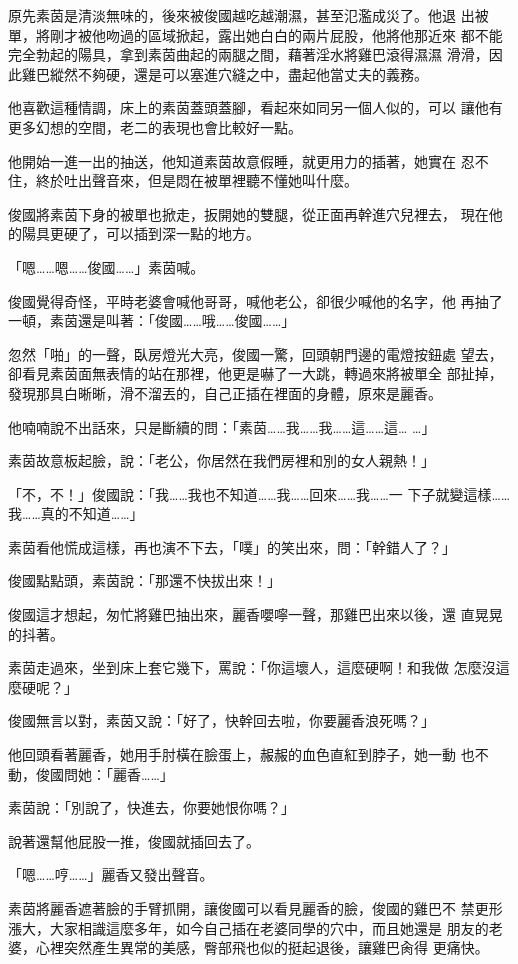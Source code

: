 原先素茵是清淡無味的，後來被俊國越吃越潮濕，甚至氾濫成災了。他退
出被單，將剛才被他吻過的區域掀起，露出她白白的兩片屁股，他將他那近來
都不能完全勃起的陽具，拿到素茵曲起的兩腿之間，藉著淫水將雞巴滾得濕濕
滑滑，因此雞巴縱然不夠硬，還是可以塞進穴縫之中，盡起他當丈夫的義務。

他喜歡這種情調，床上的素茵蓋頭蓋腳，看起來如同另一個人似的，可以
讓他有更多幻想的空間，老二的表現也會比較好一點。

他開始一進一出的抽送，他知道素茵故意假睡，就更用力的插著，她實在
忍不住，終於吐出聲音來，但是悶在被單裡聽不懂她叫什麼。

俊國將素茵下身的被單也掀走，扳開她的雙腿，從正面再幹進穴兒裡去，
現在他的陽具更硬了，可以插到深一點的地方。

「嗯……嗯……俊國……」素茵喊。

俊國覺得奇怪，平時老婆會喊他哥哥，喊他老公，卻很少喊他的名字，他
再抽了一頓，素茵還是叫著：「俊國……哦……俊國……」

忽然「啪」的一聲，臥房燈光大亮，俊國一驚，回頭朝門邊的電燈按鈕處
望去，卻看見素茵面無表情的站在那裡，他更是嚇了一大跳，轉過來將被單全
部扯掉，發現那具白晰晰，滑不溜丟的，自己正插在裡面的身體，原來是麗香。

他喃喃說不出話來，只是斷續的問：「素茵……我……我……這……這…
…」

素茵故意板起臉，說：「老公，你居然在我們房裡和別的女人親熱！」

「不，不！」俊國說：「我……我也不知道……我……回來……我……一
下子就變這樣……我……真的不知道……」

素茵看他慌成這樣，再也演不下去，「噗」的笑出來，問：「幹錯人了？」

俊國點點頭，素茵說：「那還不快拔出來！」

俊國這才想起，匆忙將雞巴抽出來，麗香嚶嚀一聲，那雞巴出來以後，還
直晃晃的抖著。

素茵走過來，坐到床上套它幾下，罵說：「你這壞人，這麼硬啊！和我做
怎麼沒這麼硬呢？」

俊國無言以對，素茵又說：「好了，快幹回去啦，你要麗香浪死嗎？」

他回頭看著麗香，她用手肘橫在臉蛋上，赧赧的血色直紅到脖子，她一動
也不動，俊國問她：「麗香……」

素茵說：「別說了，快進去，你要她恨你嗎？」

說著還幫他屁股一推，俊國就插回去了。

「嗯……哼……」麗香又發出聲音。

素茵將麗香遮著臉的手臂抓開，讓俊國可以看見麗香的臉，俊國的雞巴不
禁更形漲大，大家相識這麼多年，如今自己插在老婆同學的穴中，而且她還是
朋友的老婆，心裡突然產生異常的美感，臀部飛也似的挺起退後，讓雞巴肏得
更痛快。


